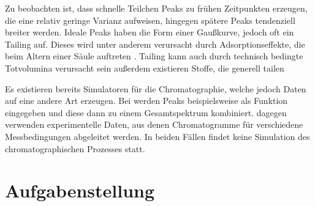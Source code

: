 \documentclass[a4paper,10pt]{article}
\begin{document}


Zu beobachten ist, dass schnelle Teilchen Peaks zu frühen Zeitpunkten erzeugen, die eine relativ geringe Varianz aufweisen, hingegen spätere Peaks tendenziell breiter werden. Ideale Peaks haben die Form einer Gaußkurve, jedoch oft ein Tailing auf. Dieses wird unter anderem verursacht durch Adsorptionseffekte, die beim Altern einer Säule auftreten \cite{kolb2003}. Tailing kann auch durch technisch bedingte Totvolumina verursacht sein außerdem existieren Stoffe, die generell tailen 


Es existieren bereits Simulatoren für die Chromatographie, welche jedoch Daten auf eine andere Art erzeugen. Bei \cite{spreadsheet} werden Peaks beispielsweise als Funktion eingegeben und diese dann zu einem Gesamtspektrum kombiniert. \cite{hplcsim} dagegen verwenden experimentelle Daten, aus denen Chromatogramme für verschiedene Messbedingungen abgeleitet werden. In beiden Fällen findet keine Simulation des chromatographischen Prozesses statt.


\section{Aufgabenstellung}
\end{document}
